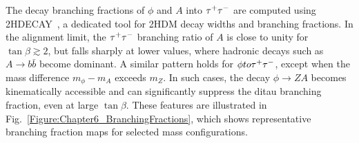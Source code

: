 The decay branching fractions of $\phi$ and $A$ into $\tau^+\tau^-$ are computed using \textsc{2HDECAY}~\cite{2HDECAY}, a dedicated tool for \ac{2HDM} decay widths and branching fractions. In the alignment limit, the $\tau^+\tau^-$ branching ratio of $A$ is close to unity for $\tan\beta \gtrsim 2$, but falls sharply at lower values, where hadronic decays such as $A \to b\bar{b}$ become dominant. A similar pattern holds for $\phi to \tau^+\tau^-$, except when the mass difference $m_\phi - m_A$ exceeds $m_Z$. In such cases, the decay $\phi \to ZA$ becomes kinematically accessible and can significantly suppress the ditau branching fraction, even at large $\tan\beta$. These features are illustrated in Fig.~\ref{Figure:Chapter6_BranchingFractions}, which shows representative branching fraction maps for selected mass configurations. 

